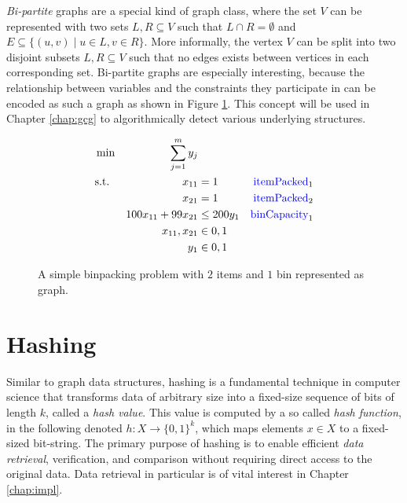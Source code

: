 		\textit{Bi-partite} graphs are a special kind of graph class, where the set $V$ can be represented with two sets $L, R \subseteq V$ such that $L \cap R = \emptyset$ and $E \subseteq \{ (u, v) \mid u \in L, v \in R \}$.
		More informally, the vertex $V$ can be split into two disjoint subsets $L, R \subseteq V$ such that no edges exists between vertices in each corresponding set.
		Bi-partite graphs are especially interesting, because the relationship between variables and the constraints they participate in can be encoded as such a graph as shown in Figure \ref{fig:prelims:graphs:binpackbipartite}. This concept will be used in Chapter \ref{chap:gcg} to algorithmically detect various underlying structures. 
		\begin{figure}[ht!]
			\centering
			\begin{minipage}{0.47\textwidth}
				
			\end{minipage}
			\begin{minipage}{0.47\textwidth}
				\begin{align}
					&\min &\sum_{j=1}^m y_j \nonumber \\
					&\text{s.t.} &x_{11} &= 1 & \text{\textcolor{blue}{itemPacked}}_1 \nonumber \\
					&& x_{21} &= 1 & \text{\textcolor{blue}{itemPacked}}_2\nonumber \\
					&& 100 x_{11} + 99 x_{21} &\leq 200 y_1 & \text{\textcolor{blue}{binCapacity}}_1\nonumber \\
					&& x_{11}, x_{21} &\in { 0, 1 }  \nonumber \\
					&& y_1 &\in { 0, 1 } \nonumber
				\end{align}
			\end{minipage}
			\caption{A simple binpacking problem with $2$ items and $1$ bin represented as  graph.}
			\label{fig:prelims:graphs:binpackbipartite}
		\end{figure}

		\clearpage

	\section{Hashing}

		Similar to graph data structures, hashing is a fundamental technique in computer science that transforms data of arbitrary size into a fixed-size sequence of bits of length $k$, called a \textit{hash value}. This value is computed by a so called \textit{hash function}, in the following denoted $h: X \rightarrow \{ 0, 1 \}^k$, which maps elements $x \in X$ to a fixed-sized bit-string. The primary purpose of hashing is to enable efficient \textit{data retrieval}, verification, and comparison without requiring direct access to the original data.
		Data retrieval in particular is of vital interest in Chapter \ref{chap:impl}.

